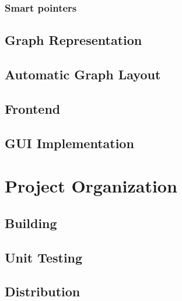\documentclass[11pt,twoside,a4paper]{article}
\begin{document}
\subsubsection{Smart pointers}


\subsection{Graph Representation}


\subsection{Automatic Graph Layout}


\subsection{Frontend}


\subsection{GUI Implementation}


\section{Project Organization}


\subsection{Building}


\subsection{Unit Testing}


\subsection{Distribution}
\end{document}
